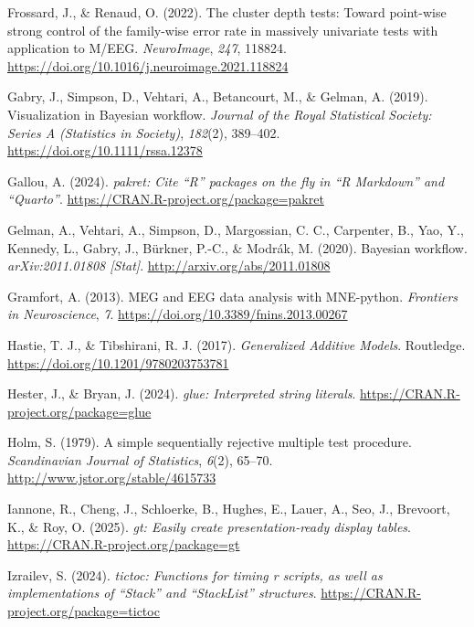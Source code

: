 \documentclass[
  doc,
  floatsintext,
  longtable,
  a4paper,
  nolmodern,
  notxfonts,
  notimes,
  colorlinks=true,linkcolor=blue,citecolor=blue,urlcolor=blue]{apa7}
\newlength{\cslhangindent}
\newenvironment{CSLReferences}[2] %
 {\begin{list}{}{%
  \setlength{\itemindent}{0pt}
  \setlength{\leftmargin}{0pt}
  \setlength{\parsep}{0pt}
  \ifodd #1
   \setlength{\leftmargin}{\cslhangindent}
   \setlength{\itemindent}{-1\cslhangindent}
  \fi
  \setlength{\itemsep}{#2\baselineskip}}}
 {\end{list}}
\begin{document}
\begin{CSLReferences}{1}{0}
Frossard, J., \& Renaud, O. (2022). The cluster depth tests: Toward
point-wise strong control of the family-wise error rate in massively
univariate tests with application to M/EEG. \emph{NeuroImage},
\emph{247}, 118824.
\url{https://doi.org/10.1016/j.neuroimage.2021.118824}

Gabry, J., Simpson, D., Vehtari, A., Betancourt, M., \& Gelman, A.
(2019). Visualization in Bayesian work{fl}ow. \emph{Journal of the Royal
Statistical Society: Series A (Statistics in Society)}, \emph{182}(2),
389--402. \url{https://doi.org/10.1111/rssa.12378}

Gallou, A. (2024). \emph{{pakret}: Cite {``{R}''} packages on the fly in
{``{R Markdown}''} and {``{Quarto}''}}.
\url{https://CRAN.R-project.org/package=pakret}

Gelman, A., Vehtari, A., Simpson, D., Margossian, C. C., Carpenter, B.,
Yao, Y., Kennedy, L., Gabry, J., Bürkner, P.-C., \& Modrák, M. (2020).
Bayesian workflow. \emph{arXiv:2011.01808 {[}Stat{]}}.
\url{http://arxiv.org/abs/2011.01808}

Gramfort, A. (2013). MEG and EEG data analysis with MNE-python.
\emph{Frontiers in Neuroscience}, \emph{7}.
\url{https://doi.org/10.3389/fnins.2013.00267}

Hastie, T. J., \& Tibshirani, R. J. (2017). \emph{Generalized Additive
Models}. Routledge. \url{https://doi.org/10.1201/9780203753781}

Hester, J., \& Bryan, J. (2024). \emph{{glue}: Interpreted string
literals}. \url{https://CRAN.R-project.org/package=glue}

Holm, S. (1979). A simple sequentially rejective multiple test
procedure. \emph{Scandinavian Journal of Statistics}, \emph{6}(2),
65--70. \url{http://www.jstor.org/stable/4615733}

Iannone, R., Cheng, J., Schloerke, B., Hughes, E., Lauer, A., Seo, J.,
Brevoort, K., \& Roy, O. (2025). \emph{{gt}: Easily create
presentation-ready display tables}.
\url{https://CRAN.R-project.org/package=gt}

Izrailev, S. (2024). \emph{{tictoc}: Functions for timing r scripts, as
well as implementations of {``{Stack}''} and {``{StackList}''}
structures}. \url{https://CRAN.R-project.org/package=tictoc}


\end{CSLReferences}
\end{document}
